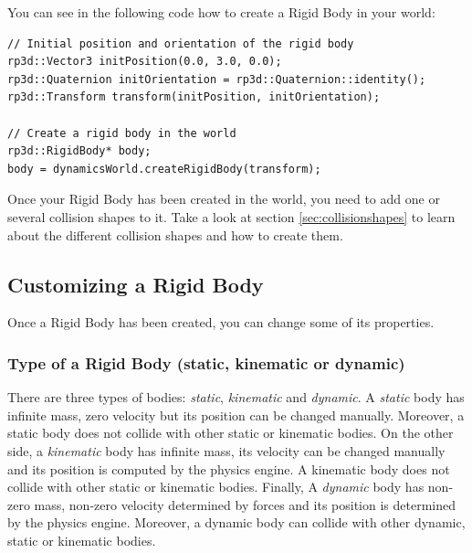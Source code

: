\documentclass[a4paper,12pt]{article}
\begin{document}
    You can see in the following code how to create a Rigid Body in your world: \\

    \begin{lstlisting}
// Initial position and orientation of the rigid body
rp3d::Vector3 initPosition(0.0, 3.0, 0.0);
rp3d::Quaternion initOrientation = rp3d::Quaternion::identity();
rp3d::Transform transform(initPosition, initOrientation);

// Create a rigid body in the world
rp3d::RigidBody* body;
body = dynamicsWorld.createRigidBody(transform);
    \end{lstlisting}

    \vspace{0.6cm}

    Once your Rigid Body has been created in the world, you need to add one or several collision shapes to it. Take a look at section \ref{sec:collisionshapes} to learn
    about the different collision shapes and how to create them. \\

    \subsection{Customizing a Rigid Body}

    Once a Rigid Body has been created, you can change some of its properties.

    \subsubsection{Type of a Rigid Body (static, kinematic or dynamic)}

    \begin{sloppypar}
        There are three types of bodies: \emph{static}, \emph{kinematic} and \emph{dynamic}. A \emph{static} body has infinite mass, zero velocity but its position can be
        changed manually. Moreover, a static body does not collide with other static or kinematic bodies. On the other side, a \emph{kinematic} body has infinite mass, its velocity can be
        changed manually and its position is computed by the physics engine. A kinematic body does not collide with other static or kinematic bodies. Finally, A \emph{dynamic} body
        has non-zero mass, non-zero velocity determined by forces and its position is determined by the physics engine. Moreover, a dynamic body can collide with other dynamic, static or
        kinematic bodies. \\
    \end{sloppypar}
\end{document}
